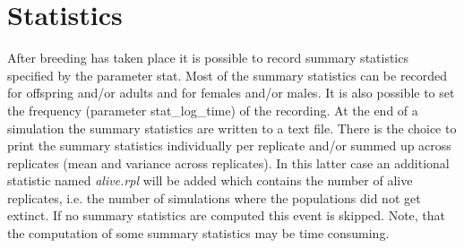 \documentclass[letterpaper,12pt,oneside]{book}
\begin{document}
\section{Statistics}\label{2statistics}
After breeding has taken place it is possible to record summary statistics specified by the parameter \textsf{stat}. Most of the summary statistics can be recorded for offspring and/or adults and for females and/or males. It is also possible to set the frequency (parameter \textsf{stat\_log\_time}) of the recording. At the end of a simulation the summary statistics are written to a text file. There is the choice to print the summary statistics individually per replicate and/or summed up across replicates (mean and variance across replicates). In this latter case an additional statistic named \textit{alive.rpl} will be added which contains the number of alive replicates, i.e. the number of simulations where the populations did not get extinct. If no summary statistics are computed this event is skipped. Note, that the computation of some summary statistics may be time consuming. 
\end{document}
